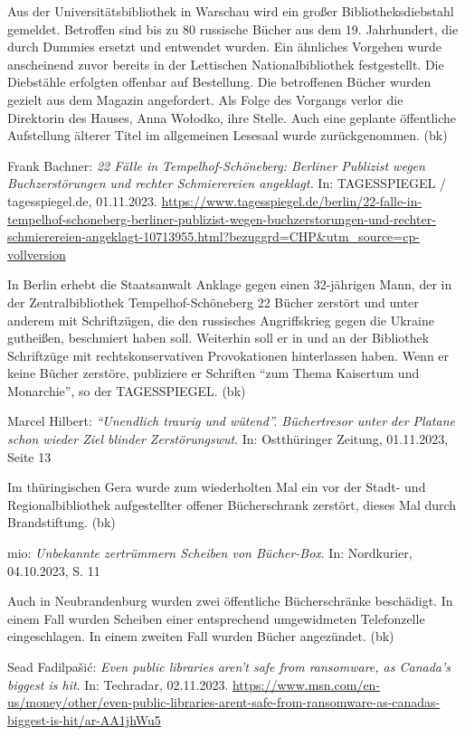 \documentclass[a4paper,
fontsize=11pt,
oneside,
numbers=noperiodatend,
parskip=half-,
bibliography=totoc,
final
]{scrartcl}
\begin{document}
Aus der Universitätsbibliothek in Warschau wird ein großer
Bibliotheksdiebstahl gemeldet. Betroffen sind bis zu 80 russische Bücher
aus dem 19. Jahrhundert, die durch Dummies ersetzt und entwendet wurden.
Ein ähnliches Vorgehen wurde anscheinend zuvor bereits in der Lettischen
Nationalbibliothek festgestellt. Die Diebstähle erfolgten offenbar auf
Bestellung. Die betroffenen Bücher wurden gezielt aus dem Magazin
angefordert. Als Folge des Vorgangs verlor die Direktorin des Hauses,
Anna Wołodko, ihre Stelle. Auch eine geplante öffentliche Aufstellung
älterer Titel im allgemeinen Lesesaal wurde zurückgenommen. (bk)

Frank Bachner: \emph{22 Fälle in Tempelhof-Schöneberg: Berliner
Publizist wegen Buchzerstörungen und rechter Schmierereien angeklagt.}
In: TAGESSPIEGEL / tagesspiegel.de, 01.11.2023.
\url{https://www.tagesspiegel.de/berlin/22-falle-in-tempelhof-schoneberg-berliner-publizist-wegen-buchzerstorungen-und-rechter-schmierereien-angeklagt-10713955.html?bezuggrd=CHP\&utm_source=cp-vollversion}

In Berlin erhebt die Staatsanwalt Anklage gegen einen 32-jährigen Mann,
der in der Zentralbibliothek Tempelhof-Schöneberg 22 Bücher zerstört und
unter anderem mit Schriftzügen, die den russisches Angriffskrieg gegen
die Ukraine gutheißen, beschmiert haben soll. Weiterhin soll er in und
an der Bibliothek Schriftzüge mit rechtskonservativen Provokationen
hinterlassen haben. Wenn er keine Bücher zerstöre, publiziere er
Schriften \enquote{zum Thema Kaisertum und Monarchie}, so der
TAGESSPIEGEL. (bk)

Marcel Hilbert: \emph{\enquote{Unendlich traurig und wütend}.
Büchertresor unter der Platane schon wieder Ziel blinder
Zerstörungswut}. In: Ostthüringer Zeitung, 01.11.2023, Seite 13

Im thüringischen Gera wurde zum wiederholten Mal ein vor der Stadt- und
Regionalbibliothek aufgestellter offener Bücherschrank zerstört, dieses
Mal durch Brandstiftung. (bk)

mio: \emph{Unbekannte zertrümmern Scheiben von Bücher-Box}. In:
Nordkurier, 04.10.2023, S. 11

Auch in Neubrandenburg wurden zwei öffentliche Bücherschränke
beschädigt. In einem Fall wurden Scheiben einer entsprechend
umgewidmeten Telefonzelle eingeschlagen. In einem zweiten Fall wurden
Bücher angezündet. (bk)

Sead Fadilpašić: \emph{Even public libraries aren't safe from
ransomware, as Canada's biggest is hit}. In: Techradar, 02.11.2023.
\url{https://www.msn.com/en-us/money/other/even-public-libraries-arent-safe-from-ransomware-as-canadas-biggest-is-hit/ar-AA1jhWu5}
\end{document}
